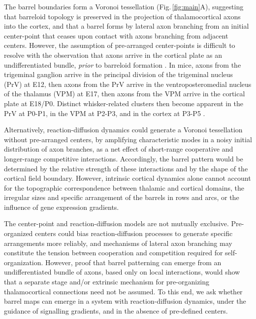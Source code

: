\documentclass[9pt,lineno]{elife}
\newcommand{\cmnt}[1]{\textcolor{colcmnt}{#1}}
\begin{document}
The barrel boundaries form a Voronoi tessellation \citep{senft_mouse_1991}
(Fig.\,\ref{fig:main}A), suggesting that barreloid topology is preserved in
the projection of thalamocortical axons into the cortex, and that a barrel
forms by lateral axon branching from an initial center-point that ceases upon
contact with axons branching from adjacent centers.  However, the assumption
of pre-arranged center-points is difficult to resolve with the observation
that axons arrive in the cortical plate as an undifferentiated bundle,
\emph{prior} to barreloid formation \citep{agmon_organized_1993}. \cmnt{In
  mice, axons from the trigeminal ganglion arrive in the principal division of
  the trigeminal nucleus (PrV) at E12, then axons from the PrV arrive
  in the ventroposteromedial nucleus of the thalamus (VPM) at E17, then axons
  from the VPM arrive in the cortical plate at E18/P0. Distinct
  whisker-related clusters then become apparent in the PrV at P0-P1, in the
  VPM at P2-P3, and in the cortex at P3-P5}
\citep{erzurumlu_development_2012,sehara_neuronal_2011}.

Alternatively, reaction-diffusion dynamics could generate a Voronoi
tessellation without pre-arranged centers, by amplifying characteristic modes
in a noisy initial distribution of axon branches, as a net effect of
short-range cooperative and longer-range competitive
interactions. Accordingly, the barrel pattern would be determined by the
relative strength of these interactions and by the shape of the cortical field
boundary. However, intrinsic cortical dynamics alone cannot account for the
topographic correspondence between thalamic and cortical domains, the
irregular sizes and specific arrangement of the barrels in rows and arcs, or
the influence of gene expression gradients.

The center-point and reaction-diffusion models are not mutually
exclusive. Pre-organized centers could bias reaction-diffusion processes to
generate specific arrangements more reliably, and mechanisms of lateral axon
branching may constitute the tension between cooperation and competition
required for self-organization. However, proof that barrel patterning can
emerge from an undifferentiated bundle of axons, based only on local
interactions, would show that a separate stage and/or extrinsic mechanism for
pre-organizing thalamocortical connections need not be assumed. To this end,
we ask whether barrel maps can emerge in a system with reaction-diffusion
dynamics, under the guidance of signalling gradients, and in the absence of
pre-defined centers.
\end{document}
